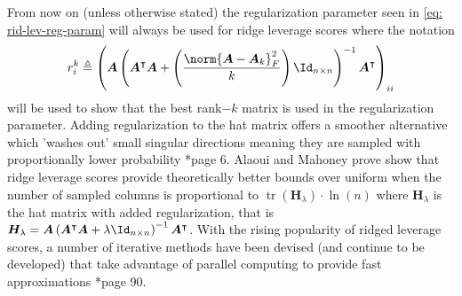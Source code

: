 From now on (unless otherwise stated) the regularization parameter seen in \ref{eq: rid-lev-reg-param} will always be used for ridge leverage scores where the notation
\begin{equation*}
    r_{i}^{k} \triangleq \left( \bm{A} \left( \bm{A}^{\intercal} \bm{A} + \left( \frac{\norm{\bm{A} - \bm{A}_k}_F^{2}}{k} \right) \Id_{n \times n} \right)^{-1} \bm{A}^{\intercal} \right)_{ii}
\end{equation*}
will be used to show that the best rank$-k$ matrix is used in the regularization parameter. Adding regularization to the hat matrix offers a smoother alternative which 'washes out' small singular directions meaning they are sampled with proportionally lower probability \cite{DBLP:journals/corr/CohenMM15}*{page 6}. Alaoui and Mahoney \cite{NIPS2015_f3f27a32} prove show that ridge leverage scores provide theoretically better bounds over uniform when the number of sampled columns is proportional to $\operatorname{tr} \left( \bm{H}_{\lambda} \right) \cdot \ln \left( n \right)$ where $\bm{H}_{\lambda}$ is the hat matrix with added regularization, that is $\bm{H}_{\lambda} = \bm{A} \left( \bm{A}^{\intercal} \bm{A} + \lambda \Id_{n \times n} \right)^{-1} \bm{A}^{\intercal}$. With the rising popularity of ridged leverage scores, a number of iterative methods have been devised (and continue to be developed) that take advantage of parallel computing to provide fast approximations \cite{martinsson2021randomized}*{page 90}.